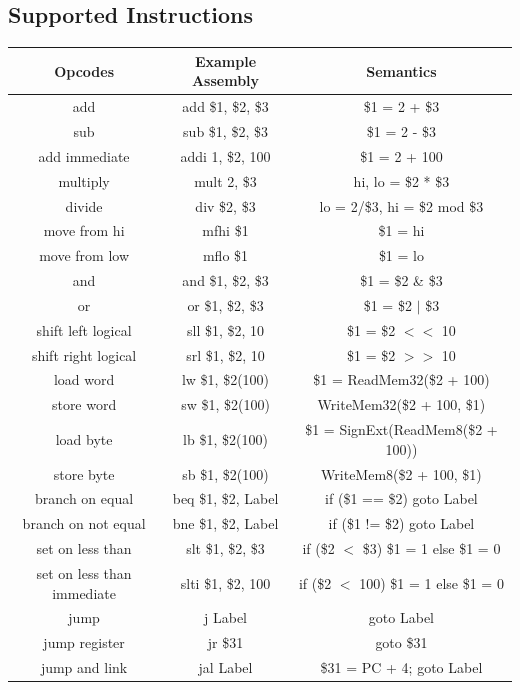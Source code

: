 \documentclass[titlepage,12pt,oneside,a4paper]{article}
\begin{document}
\subsection{Supported Instructions}
\label{ISA}
	\begin{center}
		
		\begin{tabular}{| c | c | c |}
			\hline
			Opcodes &Example Assembly& Semantics\\
			\hline
			add &add \$1, \$2, \$3 &\$1 = 2 + \$3\\
			\hline
			sub &sub \$1, \$2, \$3 &\$1 = 2 - \$3\\
			\hline
			add immediate &addi 1, \$2, 100 &\$1 = 2 + 100\\
			\hline
			multiply &mult 2, \$3 &hi, lo = \$2 * \$3\\
			\hline
			divide &div \$2, \$3 &lo = 2/\$3, hi = \$2 mod \$3\\
			\hline
			move from hi& mfhi \$1 &\$1 = hi\\
			\hline
			move from low& mflo \$1 &\$1 = lo\\
			\hline
			and &and \$1, \$2, \$3& \$1 = \$2 \& \$3\\
			\hline
			or &or \$1, \$2, \$3& \$1 = \$2 $|$ \$3\\
			\hline
			shift left logical &sll \$1, \$2, 10&\$1 = \$2 $<<$ 10\\
			\hline
			shift right logical & srl \$1, \$2, 10 &\$1 = \$2 $>>$ 10\\
			\hline
			load word &lw \$1, \$2(100) &\$1 = ReadMem32(\$2 + 100)\\
			\hline
			store word &sw \$1, \$2(100)& WriteMem32(\$2 + 100, \$1)\\
			\hline
			load byte &lb \$1, \$2(100)& \$1 = SignExt(ReadMem8(\$2 + 100))\\
			\hline
			store byte &sb \$1, \$2(100)& WriteMem8(\$2 + 100, \$1)\\
			\hline
			branch on equal &beq \$1, \$2, Label &if (\$1 == \$2) goto Label\\
			\hline
			branch on not equal &bne \$1, \$2, Label &if (\$1 != \$2) goto Label\\
			\hline
			set on less than &slt \$1, \$2, \$3 &if (\$2 $<$ \$3) \$1 = 1 else \$1 = 0\\
			\hline
			set on less than immediate& slti \$1, \$2, 100 &if (\$2 $<$ 100) \$1 = 1 else \$1 = 0\\
			\hline
			jump &j Label &goto Label\\
			\hline
			jump register &jr \$31 &goto \$31\\
			\hline
			jump and link & jal Label&\$31 = PC + 4; goto Label\\
			\hline
		\end{tabular}
	\end{center}
\end{document}
